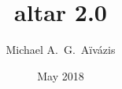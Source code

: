 %
%
%

\title[altar 2.0 -- May 2018]{altar 2.0}
\author[\url{michael.aivazis@para-sim.com}]{Michael A.~G.~A\"iv\'azis}
\date{May 2018}



